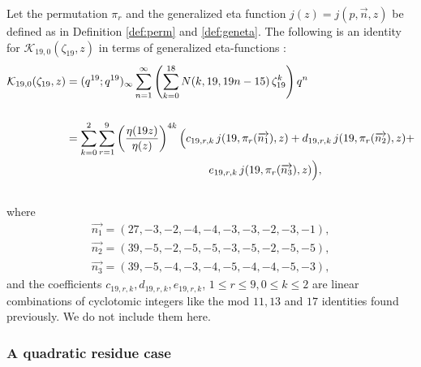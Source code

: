 \documentclass[12pt]{amsart}
\theoremstyle{definition}
\theoremstyle{remark}
\numberwithin{equation}{section}
\newcommand\Lpar[1]{\left(#1\right)}
\newcommand\refdef[1]{\ref{def:#1}}
\begin{document}
Let the permutation $\pi_r$ and the generalized eta function $j(z)=j(p,\overrightarrow{n},z)$ be defined as in Definition \refdef{perm} and \refdef{geneta}. The following is an identity for $\mathcal{K}_{19,0}(\zeta_{19},z)$ in terms of generalized eta-functions :
\\
\begin{align}
\mathcal{K}_{19,0}(\zeta_{19},z)&=(q^{19};q^{19})_\infty \sum_{n=1}^\infty \Lpar{\sum_{k=0}^{18} N(k,19,19n-15)\,\zeta_{19}^k}q^n \label{eq:rank19id1} \\
\nonumber
\\
\nonumber
&=\sum_{k=0}^{2}\sum_{r=1}^{9} \left(\dfrac{\eta(19z)}{\eta(z)}\right)^{4k}\Big(c_{19,r,k}\,j(19,\pi_r(\overrightarrow{n_1}),z)+d_{19,r,k}\,j(19,\pi_r(\overrightarrow{n_2}),z)+
\\
\nonumber
&\hspace{45mm}e_{19,r,k}\,j(19,\pi_r(\overrightarrow{n_3}),z)\Big),
\end{align}
\\
where 
\begin{align*}
\overrightarrow{n_1}=(27,-3,-2,-4,-4,-3,-3,-2,-3,-1),
\\
\overrightarrow{n_2}=(39,-5,-2,-5,-5,-3,-5,-2,-5,-5),
\\
\overrightarrow{n_3}=(39,-5,-4,-3,-4,-5,-4,-4,-5,-3),
\end{align*}
and the coefficients $c_{19,r,k}, d_{19,r,k}, e_{19,r,k}$, $1\leq r \leq 9, 0\leq k \leq 2$ are linear combinations of cyclotomic integers like the mod $11, 13$ and $17$ identities found previously. We do not include them here.
\\
\subsubsection{\textbf{A quadratic residue case}}
\end{document}
